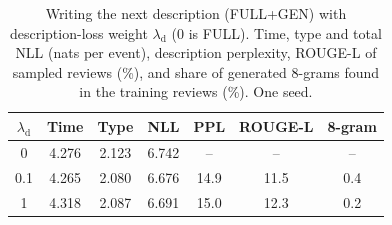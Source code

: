 \begin{table}[t]
\caption{Writing the next description (FULL+GEN) with description-loss weight $\lambda_{\text{d}}$ ($0$ is FULL). Time, type and total NLL (nats per event), description perplexity, ROUGE-L of sampled reviews (\%), and share of generated 8-grams found in the training reviews (\%). One seed.}
\label{tab:rq3gen}
\footnotesize\setlength{\tabcolsep}{2.5pt}
\begin{tabular}{@{}ccccccc@{}}
\toprule
$\lambda_{\text{d}}$ & Time & Type & NLL & PPL & ROUGE-L & 8-gram\\
\midrule
0 & 4.276 & 2.123 & 6.742 & -- & -- & --\\
0.1 & 4.265 & 2.080 & 6.676 & 14.9 & 11.5 & 0.4\\
1 & 4.318 & 2.087 & 6.691 & 15.0 & 12.3 & 0.2\\
\bottomrule
\end{tabular}
\end{table}
